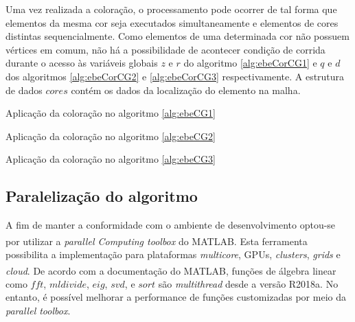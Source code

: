 \documentclass[
    12pt,               %
    openright,          %
    oneside,
    a4paper,            %
    english,            %
    french,             %
    spanish,            %
    brazil              %
    ]{abntex2}
\newcommand{\matlab}{MATLAB\textsuperscript{\textregistered}}
\begin{document}
Uma vez realizada a coloração, o processamento pode ocorrer de tal forma que elementos da mesma cor seja executados simultaneamente e elementos de cores distintas sequencialmente. Como elementos de uma determinada cor não possuem vértices em comum, não há a possibilidade de acontecer condição de corrida durante o acesso às variáveis globais $z$ e  $r$ do algoritmo \ref{alg:ebeCorCG1} e $q$ e $d$ dos algoritmos \ref{alg:ebeCorCG2} e \ref{alg:ebeCorCG3} respectivamente. A estrutura de dados $cores$ contém os dados da localização do elemento na malha.

\begin{algorithm}	
	\caption{\label{alg:ebeCorCG1}Aplicação da coloração no algoritmo \ref{alg:ebeCG1}} 
	\begin{algorithmic}[1]
		\EndFor
		\EndFor
	\end{algorithmic}
\end{algorithm}

\begin{algorithm}	
	\caption{\label{alg:ebeCorCG2}Aplicação da coloração no algoritmo \ref{alg:ebeCG2}} 
	\begin{algorithmic}[1]
		\EndFor
		\EndFor
	\end{algorithmic}
\end{algorithm}

\begin{algorithm}	
	\caption{\label{alg:ebeCorCG3}Aplicação da coloração no algoritmo \ref{alg:ebeCG3}} 
	\begin{algorithmic}[1]
		\EndFor
		\EndFor
	\end{algorithmic}
\end{algorithm}

\subsection{Paralelização do algoritmo}
A fim de manter a conformidade com o ambiente de desenvolvimento optou-se por utilizar a \textit{parallel Computing toolbox} do \matlab. Esta ferramenta possibilita a implementação para plataformas \textit{multicore}, GPUs, \textit{clusters}, \textit{grids} e \textit{cloud}. De acordo com a documentação do \matlab \cite{matMulticore}, funções de álgebra linear como $fft$, $mldivide$, $eig$, $svd$, e $sort$
são \textit{multithread} desde a versão R2018a. No entanto, é possível melhorar a performance de funções customizadas por meio da \textit{parallel toolbox}.
\end{document}
